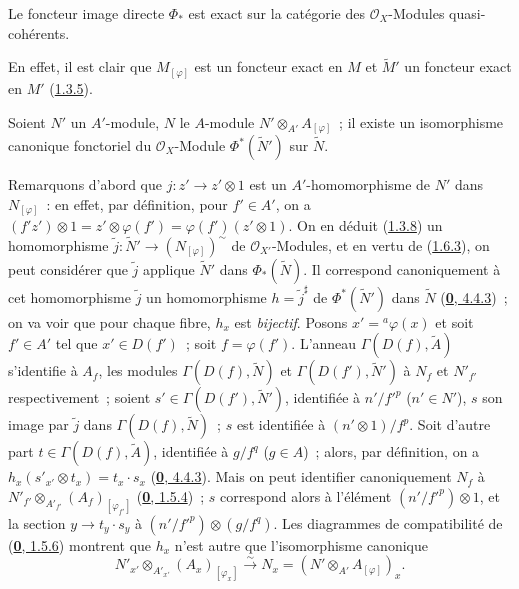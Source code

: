 \begin{corollary}[1.6.4]
\label{I.1.6.4-fr}
Le foncteur image directe $\Phi_*$ est exact sur la catégorie des
$\mathscr{O}_X$-Modules quasi-cohérents.
\end{corollary}

En effet, il est clair que $M_{[\varphi]}$ est un foncteur exact en $M$ et
$\widetilde{M}'$ un foncteur exact en $M'$ (\hyperref[I.1.3.5-fr]{1.3.5}).

\begin{proposition}[1.6.5]
\label{I.1.6.5-fr}
Soient $N'$ un $A'$-module, $N$ le $A$-module
$N'\otimes_{A'}A_{[\varphi]}$~; il existe un isomorphisme canonique
fonctoriel du $\mathscr{O}_X$-Module $\Phi^*(\widetilde{N}')$ sur
$\widetilde{N}$.
\end{proposition}

Remarquons d'abord que $j:z'\to z'\otimes 1$ est un
$A'$-homomorphisme de $N'$ dans $N_{[\varphi]}$~: en effet, par définition,
pour $f'\in A'$, on a
$(f'z')\otimes 1=z'\otimes\varphi(f')=\varphi(f')(z'\otimes 1)$. On en
déduit (\hyperref[I.1.3.8-fr]{1.3.8}) un homomorphisme
$\widetilde{j}:\widetilde{N}'\to(N_{[\varphi]})^{\sim}$ de
$\mathscr{O}_{X'}$-Modules, et en vertu de
(\hyperref[I.1.6.3-fr]{1.6.3}), on peut considérer que $\widetilde{j}$
applique $\widetilde{N}'$ dans $\Phi_*(\widetilde{N})$. Il correspond
canoniquement à cet homomorphisme $\widetilde{j}$ un homomorphisme
$h=\widetilde{j}^{\sharp}$ de $\Phi^*(\widetilde{N}')$ dans $\widetilde{N}$
(\hyperref[0.4.4.3-fr]{\textbf{0}, 4.4.3})~; on va voir que pour chaque fibre,
$h_x$ est \emph{bijectif}. Posons $x'={}^a\varphi(x)$ et soit $f'\in A'$
tel que $x'\in D(f')$~; soit $f=\varphi(f')$. L'anneau
$\Gamma(D(f),\widetilde{A})$ s'identifie à $A_f$, les modules
$\Gamma(D(f),\widetilde{N})$ et $\Gamma(D(f'),\widetilde{N}')$ à $N_f$ et
$N'_{f'}$ respectivement~; soient
$s'\in\Gamma(D(f'),\widetilde{N}')$, identifiée à $n'/{f'}^p$ ($n'\in N'$),
$s$ son image par $\widetilde{j}$ dans $\Gamma(D(f),\widetilde{N})$~; $s$
est identifiée à $(n'\otimes 1)/f^p$. Soit d'autre part
$t\in\Gamma(D(f),\widetilde{A})$, identifiée à $g/f^q$ ($g\in A$)~; alors,
par définition, on a
$h_x(s'_{x'}\otimes t_x)=t_x\cdot s_x$
(\hyperref[0.4.4.3-fr]{\textbf{0}, 4.4.3}). Mais on peut identifier canoniquement
$N_f$ à
$N'_{f'}\otimes_{A'_{f'}}(A_f)_{[\varphi_{f'}]}$
(\hyperref[0.1.5.4-fr]{\textbf{0}, 1.5.4})~; $s$ correspond alors à l'élément
$(n'/{f'}^p)\otimes 1$, et la section $y\to t_y\cdot s_y$ à
$(n'/{f'}^p)\otimes(g/f^q)$. Les diagrammes de compatibilité de
(\hyperref[0.1.5.6-fr]{\textbf{0}, 1.5.6}) montrent que $h_x$ n'est autre que
l'isomorphisme canonique
\[
  \label{I.1.6.5.1-fr}
  N'_{x'}\otimes_{A'_{x'}}(A_x)_{[\varphi_x]}
  \xrightarrow{\sim}N_x=(N'\otimes_{A'}A_{[\varphi]})_x.
  \tag{1.6.5.1}
\]

